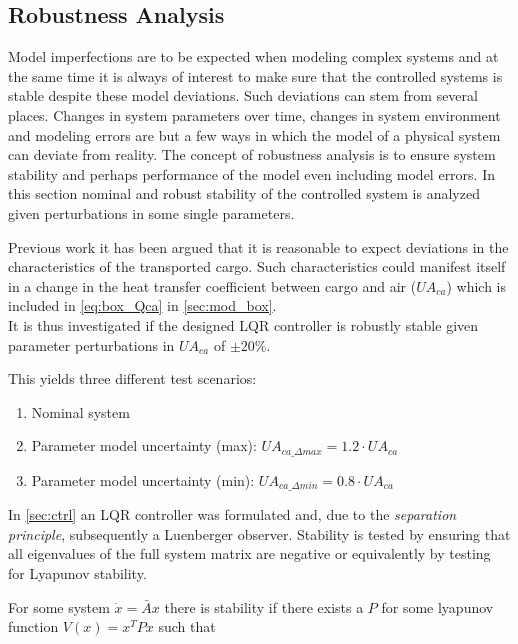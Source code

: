 \subsection{Robustness Analysis}\label{sec:robustness-analysis}

Model imperfections are to be expected when modeling complex systems and at the same time it is always of interest to make sure that the controlled systems is stable despite these model deviations. Such deviations can stem from several places. Changes in system parameters over time, changes in system environment and modeling errors are but a few ways in which the model of a physical system can deviate from reality. The concept of robustness analysis is to ensure system stability and perhaps performance of the model even including model errors. In this section nominal and robust stability of the controlled system is analyzed given perturbations in some single parameters.

Previous work \cite{Borlum2016} it has been argued that it is reasonable to expect deviations in the characteristics of the transported cargo. Such characteristics could manifest itself in a change in the heat transfer coefficient between cargo and air ($U A_{ca}$) which is included in \cref{eq:box_Qca} in \cref{sec:mod_box}.\\

\noindent It is thus investigated if the designed LQR controller is robustly stable given parameter perturbations in $U A_{ca}$ of $\pm 20 \%$.

This yields three different test scenarios:

\begin{enumerate}
	\item Nominal system
	\item Parameter model uncertainty (max): $U A_{ca\_\Delta max} = 1.2 \cdot U A_{ca}$
	\item Parameter model uncertainty (min): $U A_{ca\_\Delta min} = 0.8 \cdot U A_{ca}$
\end{enumerate}

\smallskip

\noindent In \cref{sec:ctrl} an LQR controller was formulated and, due to the \textit{separation principle}, subsequently a Luenberger observer. Stability is tested by ensuring that all eigenvalues of the full system matrix are negative or equivalently by testing for Lyapunov stability.

For some system $\dot{x} = \bar{A}x$ there is stability if there exists a $P$ for some lyapunov function $V(x) = x^TPx$ such that


